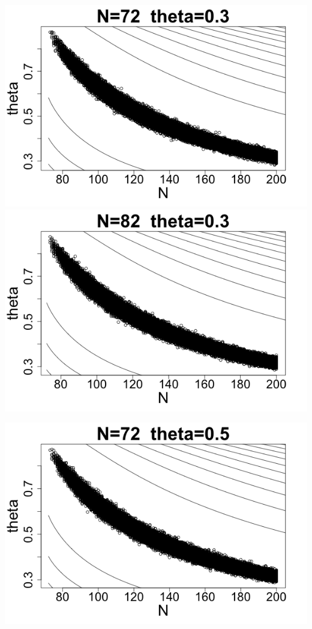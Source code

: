 \documentclass[letterpaper,10pt]{amsart}
\begin{document}
\begin{enumerate}[{1}.1]
\begin{center}
\includegraphics[scale=0.25]{Stat221Waterbuck2.png}
\includegraphics[scale=0.25]{Stat221Waterbuck7.png}
\end{center}
\begin{center}
\includegraphics[scale=0.25]{Stat221Waterbuck3.png}

\end{center}
\end{enumerate}
\end{document}
